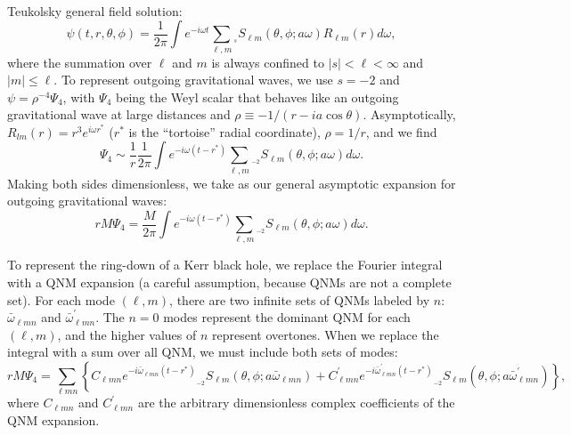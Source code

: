 \documentclass[11pt]{article}
\newcommand{\swSH}[5][]{{}_{{}_{#2}}S^{#1}_{#3}(#4;#5)}
\begin{document}
 \\

\noindent
Teukolsky general field solution:
\begin{equation}
\psi(t,r,\theta,\phi) = \frac{1}{2\pi} \int {e^{-i\omega t} \sum_{\ell,m} \swSH{s}{\ell{m}}{\theta,\phi}{a\omega}R_{\ell{m}}(r) d\omega },
\end{equation}
where the summation over $\ell$ and $m$ is always confined to $|s|<
\ell < \infty$ and $|m| \leq \ell$. To represent outgoing
gravitational waves, we use $s=-2$ and $\psi = \rho^{-4}\Psi_4$, with
$\Psi_4$ being the Weyl scalar that behaves like an 
outgoing gravitational wave at large distances and $\rho\equiv-1/(r-ia\cos\theta)$.
Asymptotically, $R_{lm}(r)=r^3e^{i\omega r^*}$ ($r^*$ is the
``tortoise'' radial coordinate), $\rho=1/r$, and we find
\begin{equation}
\Psi_4 \sim \frac1{r}\frac{1}{2\pi} \int {e^{-i\omega (t-r^*)} \sum_{\ell,m} \swSH{\minus 2}{\ell{m}}{\theta,\phi}{a\omega} d\omega }.
\end{equation}
Making both sides dimensionless, we take as our general asymptotic expansion for outgoing gravitational waves:
\begin{equation}
rM\Psi_4 = \frac{M}{2\pi} \int {e^{-i\omega (t-r^*)} \sum_{\ell,m} \swSH{\minus 2}{\ell{m}}{\theta,\phi}{a\omega} d\omega }.
\end{equation}

To represent the ring-down of a Kerr black hole, we replace the
Fourier integral with a QNM expansion (a careful assumption, because
QNMs are not a complete set).  For each mode $(\ell,m)$, there are
two infinite sets of QNMs labeled by $n$: $\bar\omega_{\ell{m}n}$ and
$\bar\omega^\prime_{\ell{m}n}$.  The $n=0$ modes represent the
dominant QNM for each $(\ell,m)$, and the higher values of $n$
represent overtones.  When we replace the integral with a sum over all QNM, we must include both sets of modes:
\begin{equation}
rM\Psi_4 = \sum_{\ell{m}n}\left\{C_{\ell{m}n}e^{-i\bar\omega_{\ell{m}n} (t-r^*)}
           \swSH{\minus 2}{\ell{m}}{\theta,\phi}{a\bar\omega_{\ell{m}n}} 
           + C^\prime_{\ell{m}n}e^{-i\bar\omega^\prime_{\ell{m}n} (t-r^*)}
           \swSH{\minus 2}{\ell{m}}{\theta,\phi}{a\bar\omega^\prime_{\ell{m}n}}
           \right\}, 
\end{equation}
where $C_{\ell{m}n}$ and $C^\prime_{\ell{m}n}$ are the arbitrary
dimensionless complex coefficients of the QNM expansion.
\end{document}
